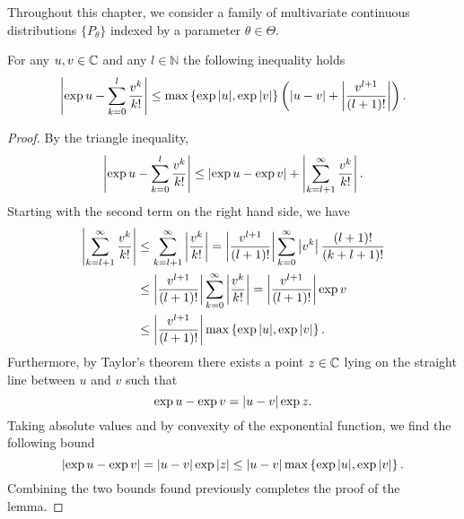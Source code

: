 Throughout this chapter, we consider a family of multivariate continuous distributions $\{ P_\theta \}$ indexed by a parameter $\theta \in \Theta$.



\begin{lemma} \label{lemma-series}
    For any $u, v \in \mathbb{C}$ and any $l \in \mathbb{N}$ the following inequality holds
    \begin{equation}
        \left|\exp{u} - \sum_{k=0}^l \frac{v^k}{k!}\right| \leq \max \left\{ \exp{|u|}, \exp{|v|} \right\}\left(\left|u - v\right| + \left|\frac{v^{l+1}}{(l+1)!}\right|\right).
    \end{equation}
\end{lemma}

\begin{proof}
    By the triangle inequality,
    \begin{equation*}
        \left|\exp{u} - \sum_{k=0}^l \frac{v^k}{k!}\right| \leq \left|\exp{u} - \exp{v}\right| + \left|\sum_{k=l+1}^\infty \frac{v^k}{k!}\right|.
    \end{equation*}
    Starting with the second term on the right hand side, we have
    \begin{align*}
        \left|\sum_{k=l+1}^\infty \frac{v^k}{k!}\right| 
        & \leq \sum_{k=l+1}^\infty \left|\frac{v^k}{k!}\right| 
        = \left|\frac{v^{l+1}}{(l+1)!}\right| \sum_{k=0}^\infty \left|v^k\right| \frac{(l+1)!}{(k + l + 1)!} \\
        & \leq \left|\frac{v^{l+1}}{(l+1)!}\right| \sum_{k=0}^\infty \left|\frac{v^k}{k!}\right|
        = \left|\frac{v^{l+1}}{(l+1)!}\right| \exp v\\
        &\leq \left|\frac{v^{l+1}}{(l+1)!}\right| \max \left\{ \exp{|u|}, \exp{|v|} \right\}.
    \end{align*}
    Furthermore, by Taylor's theorem there exists a point $z \in \mathbb{C}$ lying on the straight line between $u$ and $v$ such that
    \begin{equation*}
        \exp u - \exp v = \left|u - v\right| \exp z.
    \end{equation*}
    Taking absolute values and by convexity of the exponential function, we find the following bound
    \begin{equation*}
        \left|\exp u - \exp v\right| = \left|u - v\right| \exp |z| \leq \left|u - v\right| \max \left\{ \exp{|u|}, \exp{|v|} \right\}.
    \end{equation*}
    Combining the two bounds found previously completes the proof of the lemma.
\end{proof}


